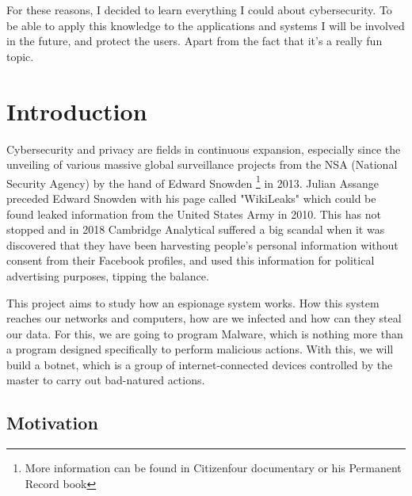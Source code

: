 \documentclass[11pt, a4paper,twoside]{tesi_upf}
\begin{document}
For these reasons, I decided to learn everything I could about cybersecurity. To be able to apply this knowledge to the applications and systems I will be involved in the future, and protect the users. Apart from the fact that it's a really fun topic.

\cleardoublepage

\setlength{\parskip}{0em}
\renewcommand{\baselinestretch}{1}\normalsize
\tableofcontents

\setlength{\parskip}{1em}
\renewcommand{\baselinestretch}{1.50}\normalsize

\listoffigures

\listoftables

\mainmatter
\chapter{Introduction}

Cybersecurity and privacy are fields in continuous expansion, especially since the unveiling of various massive global surveillance projects from the NSA (National Security Agency) by the hand of Edward Snowden \footnote{More information can be found in Citizenfour documentary or his Permanent Record book} in 2013. Julian Assange preceded Edward Snowden with his page called "WikiLeaks" which could be found leaked information from the United States Army in 2010. This has not stopped and in 2018 Cambridge Analytical suffered a big scandal when it was discovered that they have been harvesting people's personal information without consent from their Facebook profiles, and used this information for political advertising purposes, tipping the balance.

This project aims to study how an espionage system works. How this system reaches our networks and computers, how are we infected and how can they steal our data. For this, we are going to program Malware, which is nothing more than a program designed specifically to perform malicious actions. With this, we will build a botnet, which is a group of internet-connected devices controlled by the master to carry out bad-natured actions.

\section{Motivation}
\end{document}
